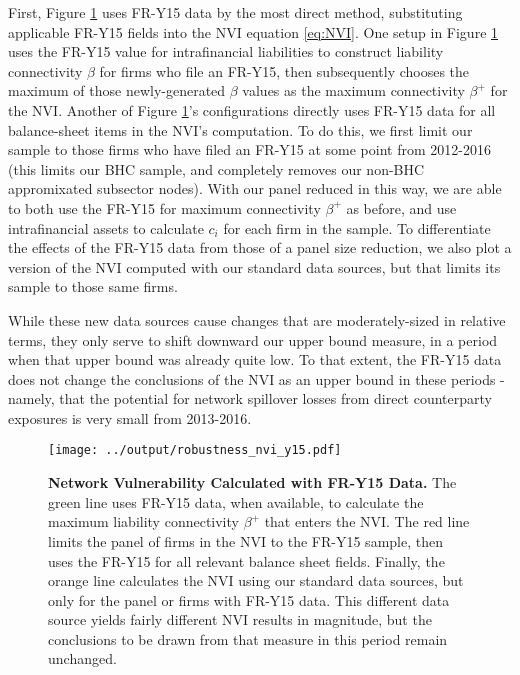 First, Figure \ref{fig:nvi_y15} uses FR-Y15 data by the most direct method, substituting applicable FR-Y15 fields into the NVI equation \ref{eq:NVI}. One setup in Figure \ref{fig:nvi_y15} uses the FR-Y15 value for intrafinancial liabilities to construct liability connectivity $\beta$ for firms who file an FR-Y15, then subsequently chooses the maximum of those newly-generated $\beta$ values as the maximum connectivity $\beta^+$ for the NVI. Another of Figure \ref{fig:nvi_y15}'s configurations directly uses FR-Y15 data for all balance-sheet items in the NVI's computation. To do this, we first limit our sample to those firms who have filed an FR-Y15 at some point from 2012-2016 (this limits our BHC sample, and completely removes our non-BHC appromixated subsector nodes). With our panel reduced in this way, we are able to both use the FR-Y15 for maximum connectivity $\beta^+$ as before, and use intrafinancial assets to calculate $c_i$ for each firm in the sample. To differentiate the effects of the FR-Y15 data from those of a panel size reduction, we also plot a version of the NVI computed with our standard data sources, but that limits its sample to those same firms.

While these new data sources cause changes that are moderately-sized in relative terms, they only serve to shift downward our upper bound measure, in a period when that upper bound was already quite low. To that extent, the FR-Y15 data does not change the conclusions of the NVI as an upper bound in these periods - namely, that the potential for network spillover losses from direct counterparty exposures is very small from 2013-2016. 

\begin{figure}[H]
\begin{center}
\texttt{[image: ../output/robustness\_nvi\_y15.pdf]}
\end{center}
\caption[]{\textbf{Network Vulnerability Calculated with FR-Y15 Data.} The green line uses FR-Y15 data, when available, to calculate the maximum liability connectivity $\beta^+$ that enters the NVI. The red line limits the panel of firms in the NVI to the FR-Y15 sample, then uses the FR-Y15 for all relevant balance sheet fields. Finally, the orange line calculates the NVI using our standard data sources, but only for the panel or firms with FR-Y15 data. This different data source yields fairly different NVI results in magnitude, but the conclusions to be drawn from that measure in this period remain unchanged.}\label{fig:nvi_y15}
\end{figure}

